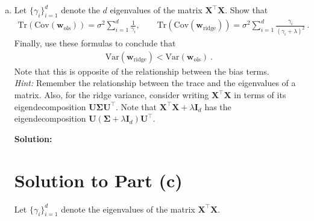 \documentclass{article}
\newcommand{\mat}[1]{\mathbf{#1}}
\renewcommand{\vec}[1]{\boldsymbol{\mathbf{#1}}}
\newenvironment{solution}{\color{blue} \smallskip \textbf{Solution:}}{}
\begin{document}
\begin{enumerate}[(a)]
\begin{solution}
This expression shows that \(\mathbb{E}[\mathbf{w}_{\text{ridge}}] \neq \mathbf{w}^*\) unless \(\lambda = 0\). Thus, \(\mathbf{w}_{\text{ridge}}\) is a biased estimator of \(\mathbf{w}^*\).


\textbf{Conclusion}

\(\mathbf{w}_{\text{ols}}\) is an unbiased estimator of \(\mathbf{w}^*\) because \(\mathbb{E}[\mathbf{w}_{\text{ols}}] = \mathbf{w}^*\).

\(\mathbf{w}_{\text{ridge}}\) is a biased estimator of \(\mathbf{w}^*\) because \(\mathbb{E}[\mathbf{w}_{\text{ridge}}] = (\mathbf{X}^\top \mathbf{X} + \lambda \mathbf{I}_d)^{-1} \mathbf{X}^\top \mathbf{X} \, \mathbf{w}^*\), which depends on \(\lambda\).





    \end{solution}

    \newpage
    \item 
    Let $\{\gamma_i\}_{i=1}^d$ denote the $d$ eigenvalues of the matrix $\mat{X}^\top\mat{X}$. Show that
    \begin{align*}
        \text{Tr}(\mathrm{Cov}(\vec{w}_{\text{ols}})) = \sigma^2 \sum_{i=1}^{d} \frac{1}{\gamma_i}, \qquad \text{Tr}(\mathrm{Cov}(\vec{w}_{\text{ridge}})) = \sigma^2 \sum_{i=1}^{d} \frac{\gamma_i}{(\gamma_i + \lambda)^2} \:.
    \end{align*}
    Finally, use these formulas to conclude that
    \begin{align*}
        \text{Var}(\vec{w}_{\text{ridge}}) < \text{Var}(\vec{w}_{\text{ols}}) \:.
    \end{align*}
    Note that this is opposite of the relationship between the bias terms. \\
    \textit{Hint:} Remember the relationship between the trace and the eigenvalues of a matrix. Also, for the ridge variance, consider writing $\mat{X}^\top\mat{X}$ in terms of its eigendecomposition $\mat{U} \mat{\Sigma} \mat{U}^\top$. Note that $\mat{X}^\top \mat{X} + \lambda \mat{I}_d$ has the eigendecomposition $\mat{U}(\mat{\Sigma} + \lambda \mat{I}_d)\mat{U}^\top$.
    
    \begin{solution}


\section*{Solution to Part (c)}

Let \(\{\gamma_i\}_{i=1}^d\) denote the eigenvalues of the matrix \(\mathbf{X}^\top \mathbf{X}\).


\end{solution}
\end{enumerate}
\end{document}
